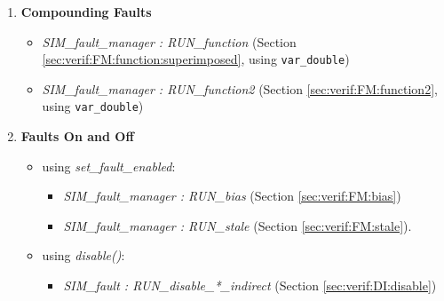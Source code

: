 \documentclass[11pt,fleqn]{report}
\begin{document}
\begin{flushleft}
\begin{enumerate}
\begin{enumerate}
     \item \textbf{Configurable Parameters}
      \begin{itemize}
       \item \textit{SIM\_fault\_manager : RUN\_function}
        (Section \ref{sec:verif:FM:function})
       \item \textit{SIM\_fault\_manager : RUN\_function2}
        (Section \ref{sec:verif:FM:function2})
       \item \textit{SIM\_fault : RUN\_linear\_int}
         (Section \ref{sec:verif:DI:function:linear})
      \end{itemize}

     \item \textbf{Function Parameters}
      \begin{itemize}
       \item \textit{SIM\_fault : RUN\_sinewave}
         (Section \ref{sec:verif:DI:sinewave})
      \end{itemize}
    \end{enumerate}


   \item \textbf{Compounding Faults}
    \begin{itemize}
     \item \textit{SIM\_fault\_manager : RUN\_function}
       (Section \ref{sec:verif:FM:function:superimposed},
       using \verb'var_double')
     \item \textit{SIM\_fault\_manager : RUN\_function2}
       (Section \ref{sec:verif:FM:function2}, using \verb'var_double')
    \end{itemize}

   \item \textbf{Faults On and Off}
    \begin{itemize}
     \item using \textit{set\_fault\_enabled}:
      \begin{itemize}
       \item \textit{SIM\_fault\_manager : RUN\_bias}
         (Section \ref{sec:verif:FM:bias})
       \item \textit{SIM\_fault\_manager : RUN\_stale}
         (Section \ref{sec:verif:FM:stale}).
      \end{itemize}

     \item using \textit{disable()}:
      \begin{itemize}
       \item \textit{SIM\_fault : RUN\_disable\_*\_indirect}
         (Section \ref{sec:verif:DI:disable})
      \end{itemize}


\end{itemize}
\end{enumerate}
\end{flushleft}
\end{document}
